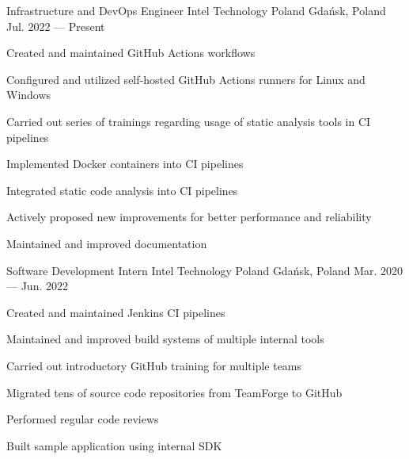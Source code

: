 
\begin{cventries}

    \cventry
    {Infrastructure and DevOps Engineer}
    {Intel Technology Poland} %
    {Gdańsk, Poland} %
    {Jul. 2022 --- Present} %
    {
        \begin{cvitems}
        \item Created and maintained GitHub Actions workflows
        \item Configured and utilized self‑hosted GitHub Actions runners for Linux and Windows
        \item Carried out series of trainings regarding usage of static analysis tools in CI pipelines
        \item Implemented Docker containers into CI pipelines
        \item Integrated static code analysis into CI pipelines
        \item Actively proposed new improvements for better performance and reliability
        \item Maintained and improved documentation
        \end{cvitems}
    }

    \cventry
    {Software Development Intern} %
    {Intel Technology Poland} %
    {Gdańsk, Poland} %
    {Mar. 2020 --- Jun. 2022} %
    {
        \begin{cvitems} %
        \item Created and maintained Jenkins CI pipelines
        \item Maintained and improved build systems of multiple internal tools
        \item Carried out introductory GitHub training for multiple teams
        \item Migrated tens of source code repositories from TeamForge to GitHub
        \item Performed regular code reviews
        \item Built sample application using internal SDK
        \end{cvitems}
    }

\end{cventries}
